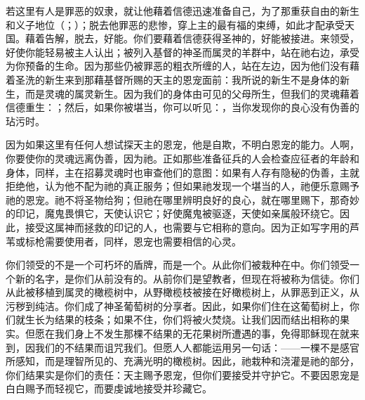 若这里有人是罪恶的奴隶，就让他藉着信德迅速准备自己，为了那重获自由的新生和义子地位（；）；脱去他罪恶的悲惨，穿上主的最有福的束缚，如此才配承受天国。藉着告解，脱去，好能。你们要藉着信德获得圣神的，好能被接进。来领受，好使你能轻易被主人认出；被列入基督的神圣而属灵的羊群中，站在祂右边，承受为你预备的生命。因为那些仍被罪恶的粗衣所缠的人，站在左边，因为他们没有藉着圣洗的新生来到那藉基督所赐的天主的恩宠面前：我所说的新生不是身体的新生，而是灵魂的属灵新生。因为我们的身体由可见的父母所生，但我们的灵魂藉着信德重生：；然后，如果你被堪当，你可以听见：，当你发现你的良心没有伪善的玷污时。\par

因为如果这里有任何人想试探天主的恩宠，他是自欺，不明白恩宠的能力。人啊，你要使你的灵魂远离伪善，因为祂。正如那些准备征兵的人会检查应征者的年龄和身体，同样，主在招募灵魂时也审查他们的意图：如果有人存有隐秘的伪善，主就拒绝他，认为他不配为祂的真正服务；但如果祂发现一个堪当的人，祂便乐意赐予祂的恩宠。祂不将圣物给狗；但祂在哪里辨明良好的良心，就在哪里赐下，那奇妙的印记，魔鬼畏惧它，天使认识它；好使魔鬼被驱逐，天使如亲属般环绕它。因此，接受这属神而拯救的印记的人，也需要与它相称的意向。因为正如写字用的芦苇或标枪需要使用者，同样，恩宠也需要相信的心灵。\par

你们领受的不是一个可朽坏的盾牌，而是一个。从此你们被栽种在中。你们领受一个新的名字，是你们从前没有的。从前你们是望教者，但现在将被称为信徒。你们从此被移植到属灵的橄榄树中，从野橄榄枝被接在好橄榄树上，从罪恶到正义，从污秽到纯洁。你们成了神圣葡萄树的分享者。因此，如果你们住在这葡萄树上，你们就生长为结果的枝条；如果不住，你们将被火焚烧。让我们因而结出相称的果实。但愿在我们身上不发生那棵不结果的无花果树所遭遇的事，免得耶稣现在就来到，因我们的不结果而诅咒我们。但愿人人都能运用另一句话：——一棵不是感官所感知，而是理智所见的、充满光明的橄榄树。因此，祂栽种和浇灌是祂的部分，你们结果实是你们的责任：天主赐予恩宠，但你们要接受并守护它。不要因恩宠是白白赐予而轻视它，而要虔诚地接受并珍藏它。\par

